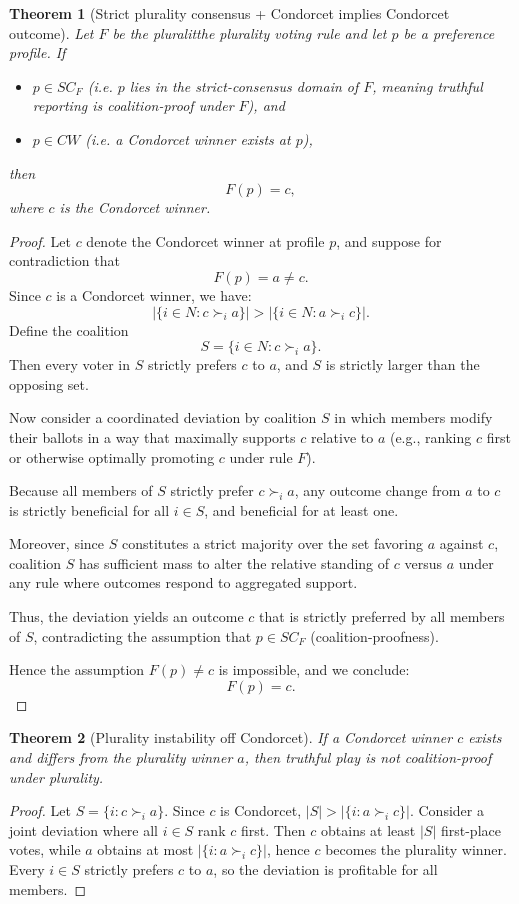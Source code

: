 \documentclass{article}
\newtheorem{theorem}{Theorem}
\begin{document}
\begin{theorem}[Strict plurality consensus + Condorcet implies Condorcet outcome]
Let $F$ be the pluralitthe plurality voting rule and let $p$ be a preference profile. If
\begin{itemize}
    \item $p \in SC_F$ (i.e. $p$ lies in the strict-consensus domain of $F$, meaning truthful reporting is coalition-proof under $F$), and
    \item $p \in CW$ (i.e. a Condorcet winner exists at $p$),
\end{itemize}
then
\[
F(p) = c,
\]
where $c$ is the Condorcet winner.
\end{theorem}

\begin{proof}
Let $c$ denote the Condorcet winner at profile $p$, and suppose for contradiction that
\[
F(p) = a \neq c.
\]
Since $c$ is a Condorcet winner, we have:
\[
|\{i \in N : c \succ_i a\}| > |\{i \in N : a \succ_i c\}|.
\]
Define the coalition
\[
S = \{ i \in N : c \succ_i a \}.
\]
Then every voter in $S$ strictly prefers $c$ to $a$, and $S$ is strictly larger than the opposing set.

Now consider a coordinated deviation by coalition $S$ in which members modify their ballots in a way that maximally supports $c$ relative to $a$ (e.g., ranking $c$ first or otherwise optimally promoting $c$ under rule $F$).

Because all members of $S$ strictly prefer $c \succ_i a$, any outcome change from $a$ to $c$ is strictly beneficial for all $i \in S$, and beneficial for at least one.

Moreover, since $S$ constitutes a strict majority over the set favoring $a$ against $c$, coalition $S$ has sufficient mass to alter the relative standing of $c$ versus $a$ under any rule where outcomes respond to aggregated support.

Thus, the deviation yields an outcome $c$ that is strictly preferred by all members of $S$, contradicting the assumption that $p \in SC_F$ (coalition-proofness).

Hence the assumption $F(p) \neq c$ is impossible, and we conclude:
\[
F(p) = c.
\]
\end{proof}

\begin{theorem}[Plurality instability off Condorcet]
If a Condorcet winner $c$ exists and differs from the plurality winner $a$, then truthful play is not coalition-proof under plurality.
\end{theorem}
\begin{proof}
Let $S = \{i: c \succ_i a\}$. Since $c$ is Condorcet, $|S| > |\{i: a \succ_i c\}|$. Consider a joint deviation where all $i\in S$ rank $c$ first. Then $c$ obtains at least $|S|$ first-place votes, while $a$ obtains at most $|\{i: a \succ_i c\}|$, hence $c$ becomes the plurality winner. Every $i\in S$ strictly prefers $c$ to $a$, so the deviation is profitable for all members.
\end{proof}
\end{document}
